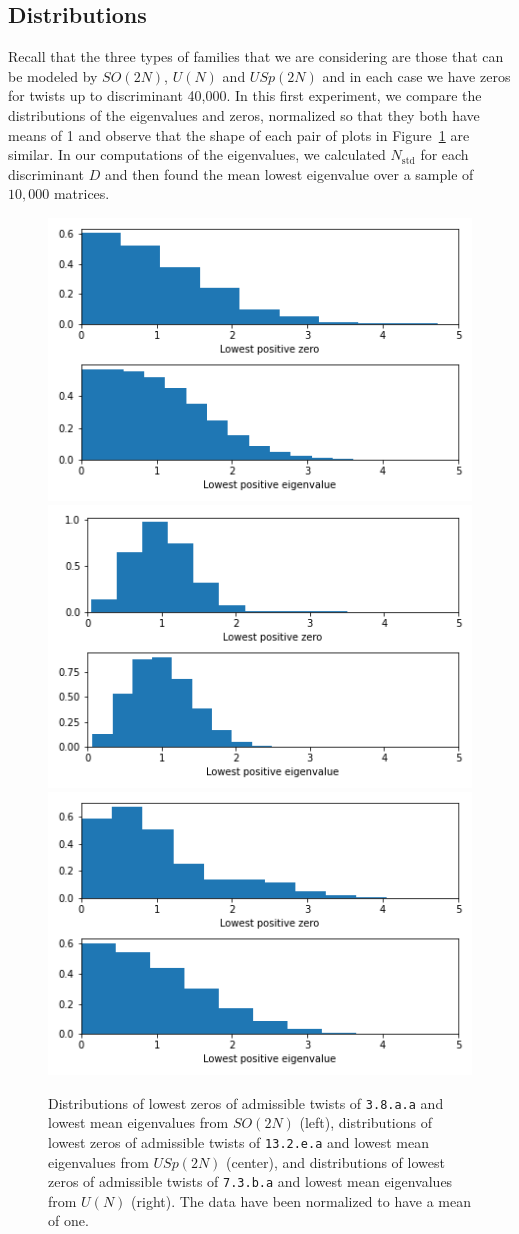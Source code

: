 \documentclass[11pt]{amsart}
\newcommand{\std}{\textrm{std}}
\begin{document}
\subsection{Distributions}  Recall that the three types of families that we are considering are those that can be modeled by $SO(2N)$, $U(N)$ and $USp(2N)$ and in each case we have zeros for twists up to discriminant 40,000.  In this first experiment, we compare the distributions of the eigenvalues and zeros, normalized so that they both have means of 1 and observe that the shape of each pair of plots in Figure~\ref{fig:dists} are similar.  In our computations of the eigenvalues, we calculated $N_\std$ for each discriminant $D$ and then found the mean lowest eigenvalue over a sample of $10,000$ matrices.
\begin{figure}
\includegraphics[width=.3\textwidth]{images/exp1.png}\hfill
\includegraphics[width=.3\textwidth]{images/exp2.png}\hfill
\includegraphics[width=.3\textwidth]{images/exp3.png}\\
\caption{Distributions of lowest zeros of admissible twists of \texttt{3.8.a.a} and lowest mean eigenvalues from $SO(2N)$ (left), distributions of lowest zeros of admissible twists of \texttt{13.2.e.a} and lowest mean eigenvalues from $USp(2N)$ (center), and distributions of lowest zeros of admissible twists of \texttt{7.3.b.a} and lowest mean eigenvalues from $U(N)$ (right). The data have been normalized to have a mean of one.}
\label{fig:dists}
\end{figure}
\end{document}
